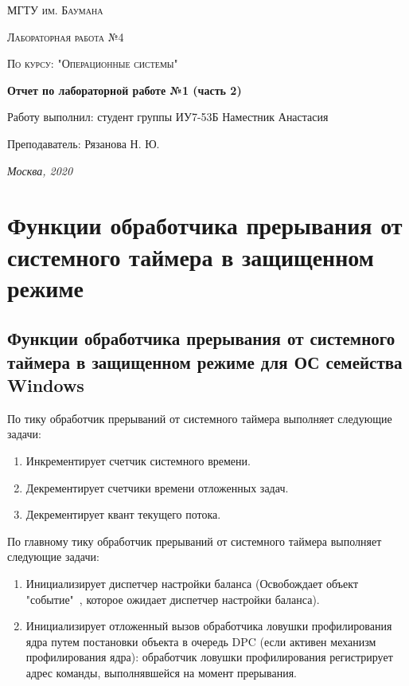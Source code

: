 \documentclass[12pt]{report}
\begin{document}
 
\begin{titlepage}
	\centering
	{\scshape\LARGE МГТУ им. Баумана \par}
	\vspace{3cm}
	{\scshape\Large Лабораторная работа №4\par}
	\vspace{0.5cm}	
	{\scshape\Large По курсу: "Операционные системы"\par}
	\vspace{1.5cm}
	{\huge\bfseries Отчет по лабораторной работе №1 (часть 2)\par}
	\vspace{2cm}
	\Large Работу выполнил: студент группы ИУ7-53Б Наместник Анастасия\par
	\vspace{0.5cm}
	\Large Преподаватель:  Рязанова Н. Ю.\par

	\vfill
	\large \textit {Москва, 2020} \par
\end{titlepage}

\tableofcontents

\newpage

\chapter{Функции обработчика прерывания от системного таймера в защищенном режиме}

\section{Функции обработчика прерывания от системного таймера в защищенном режиме для ОС семейства Windows}

По тику обработчик прерываний от системного таймера выполняет следующие задачи:
\begin{enumerate}
\item Инкрементирует счетчик системного времени.
\item Декрементирует счетчики времени отложенных задач.
\item Декрементирует квант текущего потока.
\end{enumerate}

По главному тику обработчик прерываний от системного таймера выполняет следующие задачи: 
\begin{enumerate}
\item Инициализирует диспетчер настройки баланса (Освобождает объект "событие"\ , которое ожидает диспетчер настройки баланса).
\item Инициализирует отложенный вызов обработчика ловушки профилирования ядра путем постановки объекта в очередь DPC (если активен механизм профилирования ядра): обработчик ловушки профилирования регистрирует адрес команды, выполнявшейся на момент прерывания.
\end{enumerate}
\end{document}
